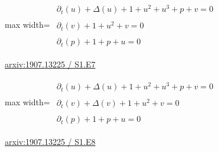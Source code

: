 \documentclass[UTF8,10pt,a4paper,fontset=mac]{ctexart}
\begin{document}
\begin{minipage}{\linewidth}\begin{center}\begin{adjustbox}{max width=\linewidth}$\displaystyle\begin{gathered}\begin{gathered}\partial_{t}(u)+\Delta(u)+1+u^{2}+u^{3}+p+v=0\end{gathered}\\[5pt]\begin{gathered}\partial_{t}(v)+1+u^{2}+v=0\end{gathered}\\[5pt]\begin{gathered}\partial_{t}(p)+1+p+u=0\end{gathered}\end{gathered}$\end{adjustbox}\end{center}{\small\href{https://arxiv.org/html/1907.13225#S1.E7}{arxiv:1907.13225 / S1.E7}}\par\end{minipage}\par\vspace{6mm}

\begin{minipage}{\linewidth}\begin{center}\begin{adjustbox}{max width=\linewidth}$\displaystyle\begin{gathered}\begin{gathered}\partial_{t}(u)+\Delta(u)+1+u^{2}+u^{3}+p+v=0\end{gathered}\\[5pt]\begin{gathered}\partial_{t}(v)+\Delta(v)+1+u^{2}+v=0\end{gathered}\\[5pt]\begin{gathered}\partial_{t}(p)+1+p+u=0\end{gathered}\end{gathered}$\end{adjustbox}\end{center}{\small\href{https://arxiv.org/html/1907.13225#S1.E8}{arxiv:1907.13225 / S1.E8}}\par\end{minipage}\par\vspace{6mm}
\end{document}

